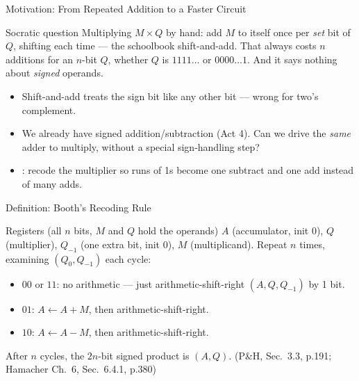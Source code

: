 \documentclass[aspectratio=169]{beamer}
\begin{document}
\begin{frame}{Motivation: From Repeated Addition to a Faster Circuit}
  \begin{block}{Socratic question}
    Multiplying $M \times Q$ by hand: add $M$ to itself once per \emph{set}
    bit of $Q$, shifting each time --- the schoolbook shift-and-add. That
    always costs $n$ additions for an $n$-bit $Q$, whether $Q$ is $1111\dots$
    or $0000\dots1$. And it says nothing about \emph{signed} operands.
  \end{block}
  \begin{itemize}
    \item Shift-and-add treats the sign bit like any other bit --- wrong for
      two's complement.
    \item We already have signed addition/subtraction (Act 4). Can we drive
      the \emph{same} adder to multiply, without a special sign-handling
      step?
    \item {}: recode the multiplier so runs of 1s become
      one subtract and one add instead of many adds.
  \end{itemize}
\end{frame}

\begin{frame}{Definition: Booth's Recoding Rule}
  \begin{block}{Registers (all $n$ bits, $M$ and $Q$ hold the operands)}
    $A$ (accumulator, init $0$), $Q$ (multiplier), $Q_{-1}$ (one extra bit,
    init $0$), $M$ (multiplicand). Repeat $n$ times, examining $(Q_0,
    Q_{-1})$ each cycle:
  \end{block}
  \begin{itemize}
    \item $00$ or $11$: no arithmetic --- just arithmetic-shift-right
      $(A,Q,Q_{-1})$ by 1 bit.
    \item $01$: $A \gets A + M$, then arithmetic-shift-right.
    \item $10$: $A \gets A - M$, then arithmetic-shift-right.
  \end{itemize}
  After $n$ cycles, the $2n$-bit signed product is $(A,Q)$.
  (P\&H, Sec.~3.3, p.191; Hamacher Ch.~6, Sec.~6.4.1, p.380)
  \cite{PattersonHennessy2017_computer_organization_design,Hamacher2002_computer_organization}
\end{frame}
\end{document}

